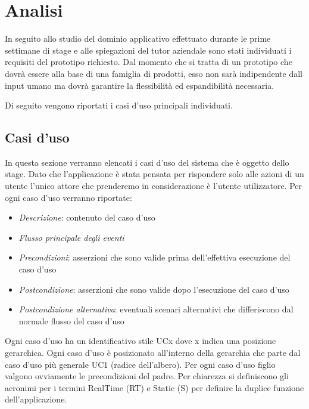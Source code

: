
\section{Analisi}

In seguito allo studio del dominio applicativo effettuato durante le prime settimane di stage e alle spiegazioni del tutor aziendale sono stati individuati i requisiti del prototipo richiesto.
Dal momento che si tratta di un prototipo che dovrà essere alla base di una famiglia di prodotti, esso non sarà indipendente dall input umano ma dovrà garantire la flessibilità ed espandibilità necessaria.

Di seguito vengono riportati i casi d'uso principali individuati.

\subsection{Casi d'uso}

In questa sezione verranno elencati i casi d'uso del sistema che è oggetto dello stage.
Dato che l'applicazione è stata pensata per rispondere solo alle azioni di un utente l'unico attore che prenderemo in
considerazione è l'utente utilizzatore. Per ogni caso d'uso verranno riportate:

\begin{itemize}
\item  \textit{Descrizione}: contenuto del caso d'uso
\item  \textit{Flusso principale degli eventi}
\item  \textit{Precondizioni}: asserzioni che sono valide prima dell'effettiva esecuzione del
caso d'uso
\item  \textit{Postcondizione}: asserzioni che sono valide dopo l'esecuzione del caso d'uso
\item  \textit{Postcondizione alternativa}: eventuali scenari alternativi che differiscono dal normale flusso del caso d'uso
\end{itemize}
Ogni caso d'uso ha un identificativo stile UCx dove x indica una posizione gerarchica.
Ogni caso d'uso è posizionato all'interno della gerarchia che parte dal caso d'uso più generale UC1 (radice dell'albero). Per ogni caso d'uso figlio valgono ovviamente le precondizioni del padre. Per chiarezza si definiscono gli acronimi per i termini RealTime (RT) e Static (S) per definire la duplice funzione dell'applicazione.

